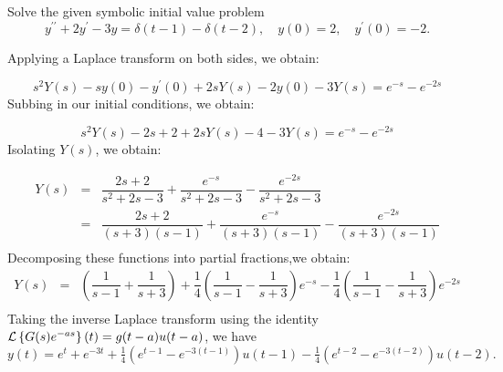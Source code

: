 \documentclass[11pt]{article}
\begin{document}
\begin{problem}
Solve the given symbolic initial value problem
\begin{equation*}
y^{\prime \prime} + 2 y^{\prime} - 3 y = \delta(t-1) - \delta(t-2) , \quad y(0) =2 , \quad y^{\prime}(0) = -2.
\end{equation*}
\end{problem}
\begin{solution}
Applying a Laplace transform on both sides, we obtain:

\begin{equation*}
s^2 Y(s) -sy(0) - y^{\prime}(0) + 2sY(s) - 2y(0) - 3 Y(s) = e^{-s} - e^{-2s}
\end{equation*}
Subbing in our initial conditions, we obtain:

\begin{equation*}
s^2 Y(s) -2s +2 + 2sY(s) - 4 - 3 Y(s) = e^{-s} - e^{-2s}
\end{equation*}
Isolating $Y(s)$, we obtain:

\begin{eqnarray*}
Y(s) & = & \dfrac{2s+2}{s^2+2s-3}+ \dfrac{e^{-s}}{s^2+2s-3} - \dfrac{e^{-2s}}{s^2+2s-3}  \\
& = & \dfrac{2s+2}{(s+3)(s-1)}+\dfrac{e^{-s}}{(s+3)(s-1)} - \dfrac{e^{-2s}}{(s+3)(s-1)}  \\
\end{eqnarray*}
Decomposing these functions into partial fractions,we obtain:
\begin{eqnarray*}
Y(s) & = & \left( \dfrac{1}{s-1} + \dfrac{1}{s+3} \right)+ \dfrac{1}{4}\left( \dfrac{1}{s-1} - \dfrac{1}{s+3} \right) e^{-s}  -\dfrac{1}{4} \left( \dfrac{1}{s-1} - \dfrac{1}{s+3} \right) e^{-2s} \\
\end{eqnarray*}
Taking the inverse Laplace transform using the identity ${\cal L} \left\{ G(s)e^{-as} \right\}(t) = g(t-a)u(t-a)$, we have
\begin{equation*}
\boxed{y(t) = e^{t}+e^{-3t}   + \tfrac{1}{4} \left( e^{t-1}-e^{-3(t-1)} \right)u(t-1) - \tfrac{1}{4} \left( e^{t-2}-e^{-3(t-2)} \right)u(t-2)}.
\end{equation*}
\end{solution}
\end{document}
